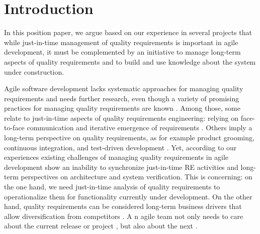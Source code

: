 \section{Introduction}




In this position paper, we argue based on our experience in several projects that while just-in-time management of quality requirements is important in agile development, it must be complemented by an initiative to manage long-term aspects of quality requirements and to build and use knowledge about the system under construction.




Agile software development lacks systematic approaches for managing quality requirements \cite{inayat2015systematic} and needs further research, even though a variety of promising practices for managing quality requirements are known \cite{Alsaqaf2017}. 
Among those, some relate to just-in-time aspects of quality requirements engineering: relying on face-to-face communication and iterative emergence of requirements \cite{Alsaqaf2017}. 
Others imply a long-term perspective on quality requirements, as for example product grooming, continuous integration, and test-driven development \cite{Alsaqaf2017}.
Yet, according to our experiences existing challenges of managing quality requirements in agile development show an inability to synchronize just-in-time RE activities and long-term perspectives on architecture and system verification. 
This is concerning: on the one hand, we need just-in-time analysis of quality requirements to operationalize them for functionality currently under development.
On the other hand, quality requirements can be considered long-term business drivers that allow diversification from competitors \cite{BerntssonSvensson2015}.
A%
n agile team not only needs to care about the current %
release or project%
, but also about the next %
\cite{Cockburn2009}.

